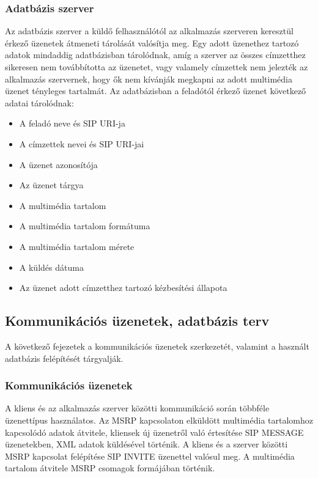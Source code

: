 \subsubsection{Adatbázis szerver}
\label{sec:dbserver}

Az adatbázis szerver a küldő felhasználótól az alkalmazás szerveren keresztül érkező üzenetek átmeneti tárolását valósítja meg. Egy adott üzenethez tartozó adatok mindaddig adatbázisban tárolódnak, amíg a szerver az összes címzetthez sikeresen nem továbbította az üzenetet, vagy valamely címzettek nem jelezték az alkalmazás szervernek, hogy ők nem kívánják megkapni az adott multimédia üzenet tényleges tartalmát. Az adatbázisban a feladótól érkező üzenet következő adatai  tárolódnak:

\begin{itemize}\itemsep1pt
\item	A feladó neve és SIP URI-ja
\item A címzettek nevei és SIP URI-jai
\item A üzenet azonosítója
\item Az üzenet tárgya
\item A multimédia tartalom
\item A multimédia tartalom formátuma
\item A multimédia tartalom mérete
\item A küldés dátuma
\item Az üzenet adott címzetthez tartozó kézbesítési állapota
\end{itemize}


\subsection{Kommunikációs üzenetek, adatbázis terv}

A következő fejezetek a kommunikációs üzenetek szerkezetét, valamint a használt adatbázis felépítését tárgyalják.

\subsubsection{Kommunikációs üzenetek}
\label{sec:komm_uzenetek}

A kliens és az alkalmazás szerver közötti kommunikáció során többféle üzenettípus használatos. Az MSRP kapcsolaton elküldött multimédia tartalomhoz kapcsolódó adatok átvitele, kliensek új üzenetről való értesítése SIP MESSAGE üzenetekben, XML adatok küldésével történik. A kliens és a szerver közötti MSRP kapcsolat felépítése SIP INVITE üzenettel valósul meg. A multimédia tartalom átvitele MSRP csomagok formájában történik. 

